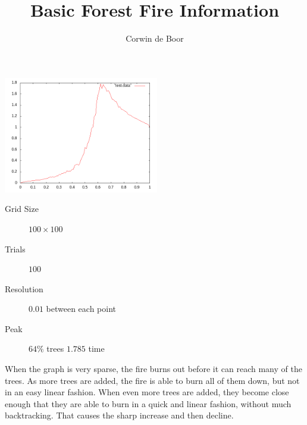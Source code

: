 \documentclass[12pt]{article}
\title{Basic Forest Fire Information}
\author{Corwin de Boor}
\begin{document}
\maketitle

\includegraphics[height=2in]{basicfire}

\begin{description}
	\item[Grid Size] $100\times100$
	\item[Trials] $100$
	\item[Resolution] $0.01$ between each point
	\item[Peak] $64\%$ trees $1.785$ time
\end{description}

When the graph is very sparse, the fire burns out before it can reach many of
the trees. As more trees are added, the fire is able to burn all of them
down, but not in an easy linear fashion. When even more trees are added, they
become close enough that they are able to burn in a quick and linear fashion,
without much backtracking. That causes the sharp increase and then decline.
\end{document}
